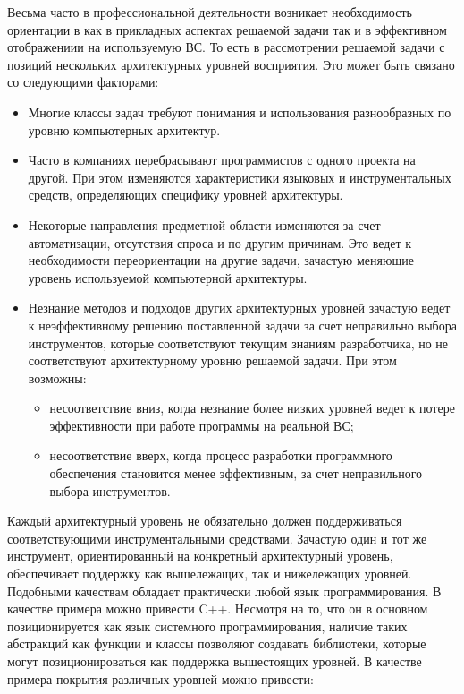 Весьма часто в профессиональной деятельности возникает необходимость ориентации в как в прикладных аспектах решаемой задачи так и в эффективном отображениии на используемую ВС. То есть в рассмотрении решаемой задачи с позиций нескольких архитектурных уровней восприятия. Это может быть связано со следующими факторами:

\begin{itemize}
    \item Многие классы задач требуют понимания и использования разнообразных по уровню компьютерных архитектур.
    \item Часто в компаниях перебрасывают программистов с одного проекта на другой. При этом изменяются характеристики языковых и инструментальных средств, определяющих специфику уровней архитектуры.
    \item Некоторые направления предметной области изменяются за счет автоматизации, отсутствия спроса и по другим причинам. Это ведет к необходимости переориентации на другие задачи, зачастую меняющие уровень используемой компьютерной архитектуры.
    \item Незнание методов и подходов других архитектурных уровней зачастую ведет к неэффективному решению поставленной задачи за счет неправильно выбора инструментов, которые соответствуют текущим знаниям разработчика, но не соответствуют архитектурному уровню решаемой задачи. При этом возможны:
    \begin{itemize}
        \item несоответствие вниз, когда незнание более низких уровней ведет к потере эффективности при работе программы на реальной ВС;
        \item несоответствие вверх, когда процесс разработки программного обеспечения становится менее эффективным, за счет неправильного выбора инструментов.
    \end{itemize}
\end{itemize}

Каждый архитектурный уровень не обязательно должен поддерживаться соответствующими инструментальными средствами. Зачастую один и тот же инструмент, ориентированный на конкретный архитектурный уровень, обеспечивает поддержку как вышележащих, так и нижележащих уровней. Подобными качествам обладает практически любой язык программирования. В качестве примера можно привести C++. Несмотря на то, что он в основном позиционируется как язык системного программирования, наличие таких абстракций как функции и классы позволяют создавать библиотеки, которые могут позиционироваться как поддержка вышестоящих уровней. В качестве примера покрытия различных уровней можно привести:

